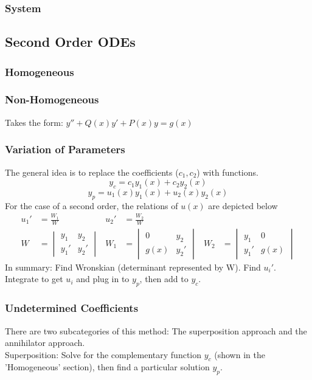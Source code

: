     \subsubsection{System} 

\subsection{Second Order ODEs}
    \subsubsection{Homogeneous}
    \subsubsection{Non-Homogeneous}
        Takes the form: $y''+Q(x)y'+P(x)y=g(x)$
    \subsubsection{Variation of Parameters}
        The general idea is to replace the coefficients ($c_1,c_2$) with functions. 
        $$y_c=c_1y_1(x)+c_2y_2(x)$$
        $$y_p=u_1(x)y_1(x)+u_2(x)y_2(x)$$
        For the case of a second order, the relations of $u(x)$ are depicted below
        \begin{align*}
            u_1'&=\frac{W_1}{W} & u_2'&=\frac{W_2}{W}\\[0.7 cm]
            W&=
            \begin{vmatrix}
            y_1 & y_2 \\
            y_1'& y_2'
            \end{vmatrix}
            &
            W_1&=
            \begin{vmatrix}
            0 & y_2 \\
            g(x)& y_2'
            \end{vmatrix}
            &
            W_2&=
            \begin{vmatrix}
            y_1 & 0 \\
            y_1'& g(x)
            \end{vmatrix}
        \end{align*}
        In summary: Find Wronskian (determinant represented by W). Find $u_i'$. Integrate to get $u_i$ and plug in to $y_p$, then add to $y_c$.

    \subsubsection{Undetermined Coefficients}
        There are two subcategories of this method: The superposition approach and the annihilator approach.\\
        Superposition: Solve for the complementary function $y_c$ (shown in the 'Homogeneous' section), then find a particular solution $y_p$.
